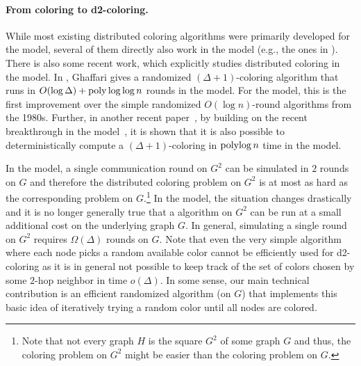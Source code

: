 \paragraph{From coloring to d2-coloring.} While most existing distributed coloring algorithms were primarily developed for the \LOCAL model, several of them directly also work in the \CONGEST model (e.g., the ones in \cite{alon86,luby86,linial92,johansson99,Kuhn2006On,barenboim10,BEK15,barenboim15,BEG18,kuhn20_coloring}). There is also some recent work, which explicitly studies distributed coloring in the \CONGEST model. In \cite{ghaffari19}, Ghaffari gives a randomized $(\Delta+1)$-coloring algorithm that runs in $O(\log\Delta) + \operatorname{poly}\log\log n$ rounds in the \CONGEST model. For the \CONGEST model, this is the first improvement over the simple randomized $O(\log n)$-round algorithms from the 1980s. Further, in another recent paper~\cite{det_congest_coloring}, by building on the recent breakthrough in the \LOCAL model~\cite{RG19}, it is shown that it is also possible to deterministically compute a $(\Delta+1)$-coloring in $\operatorname{polylog} n$ time in the \CONGEST model.

In the \LOCAL model, a single communication round on $G^2$ can be simulated in $2$ rounds on $G$ and therefore the distributed coloring problem on $G^2$ is at most as hard as the corresponding problem on $G$.\footnote{Note that not every graph $H$ is the square $G^2$ of some graph $G$ and thus, the coloring problem on $G^2$ might be easier than the coloring problem on $G$.} In the \CONGEST model, the situation changes drastically and it is no longer generally true that a \CONGEST algorithm on $G^2$ can be run at a small additional cost on the underlying graph $G$. In general, simulating a single \CONGEST round on $G^2$ requires $\Omega(\Delta)$ \CONGEST rounds on $G$. Note that even the very simple algorithm where each node picks a random available color cannot be efficiently used for d2-coloring as it is in general not possible to keep track of the set of colors chosen by some $2$-hop neighbor in time $o(\Delta)$. In some sense, our main technical contribution is an efficient randomized \CONGEST algorithm (on $G$) that implements this basic idea of iteratively trying a random color until all nodes are colored.

